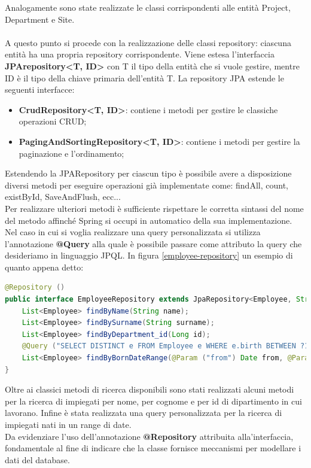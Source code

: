Analogamente sono state realizzate le classi corrispondenti alle entità Project, Department e Site.\\\\
A questo punto si procede con la realizzazione delle classi repository: ciascuna entità ha una propria repository corrispondente. Viene estesa l'interfaccia \textbf{JPArepository<T, ID>} con T il tipo della entità che si vuole gestire, mentre ID è il tipo della chiave primaria dell'entità T. La repository JPA estende le seguenti interfacce:
\begin{itemize}
  \item \textbf{CrudRepository<T, ID>}: contiene i metodi per gestire le classiche operazioni CRUD;
  \item \textbf{PagingAndSortingRepository<T, ID>}: contiene i metodi per gestire la paginazione e l'ordinamento;
\end{itemize}
Estendendo la JPARepository per ciascun tipo è possibile avere a disposizione diversi metodi per eseguire operazioni già implementate come: findAll, count, existById, SaveAndFlush, ecc...\\
Per realizzare ulteriori metodi è sufficiente rispettare le corretta sintassi del nome del metodo affinché Spring si occupi in automatico della sua implementazione.\\
Nel caso in cui si voglia realizzare una query personalizzata si utilizza l'annotazione \textbf{@Query} alla quale è possibile passare come attributo la query che desideriamo in linguaggio JPQL. In figura \ref{employee-repository} un esempio di quanto appena detto:
\begin{lstlisting}[language=Java, morecomment={[s][\color{DarkOrchid}]{@}{\ }},  morecomment={[s][\color{OliveGreen}]{"}{"}},]
@Repository ()
public interface EmployeeRepository extends JpaRepository<Employee, String> {
    List<Employee> findByName(String name);
    List<Employee> findBySurname(String surname);
    List<Employee> findByDepartment_id(Long id);
    @Query ("SELECT DISTINCT e FROM Employee e WHERE e.birth BETWEEN ?1 AND ?2")
    List<Employee> findByBornDateRange(@Param ("from") Date from, @Param ("to") Date to);
}
\end{lstlisting}
Oltre ai classici metodi di ricerca disponibili sono stati realizzati alcuni metodi per la ricerca di impiegati per nome, per cognome e per id di dipartimento in cui lavorano. Infine è stata realizzata una query personalizzata per la ricerca di impiegati nati in un range di date.\\
Da evidenziare l'uso dell'annotazione \textbf{@Repository} attribuita alla'interfaccia, fondamentale al fine di indicare che la classe fornisce meccanismi per modellare i dati del database.
